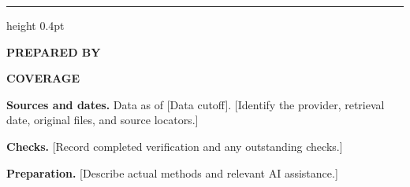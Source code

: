 \documentclass[a4paper,10pt]{article}
\newcommand{\DataDate}{[Data cutoff]}
\newcommand{\TeamName}{[Team]}
\newcommand{\ReportAuthor}{[Analyst]}
\newcommand{\Coverage}{[Coverage]}
\begin{document}
{\color{MemoRule}\hrule height 0.4pt}\medskip
\begin{minipage}[t]{0.36\textwidth}
\vspace{0pt}\small
\setlength{\parskip}{3pt}
\textbf{PREPARED BY}\par\ReportAuthor\par\TeamName\par
\medskip\textbf{COVERAGE}\par\Coverage
\end{minipage}\hfill
\begin{minipage}[t]{0.60\textwidth}
\vspace{0pt}\footnotesize
\setlength{\parskip}{3pt}
\textbf{Sources and dates.} Data as of \DataDate.
[Identify the provider, retrieval date, original files, and source locators.]

\textbf{Checks.} [Record completed verification and any outstanding checks.]

\textbf{Preparation.} [Describe actual methods and relevant AI assistance.]
\end{minipage}
\end{document}

